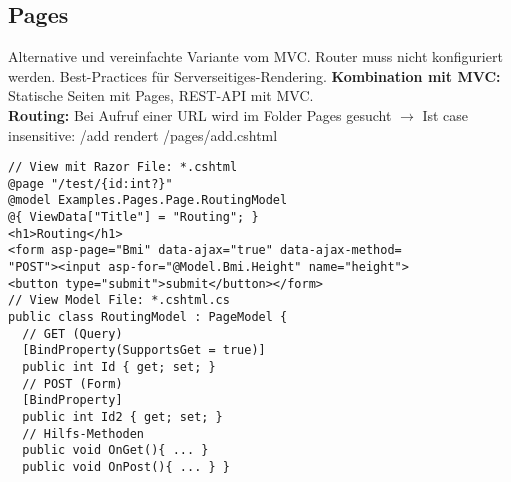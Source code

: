 \subsection{Pages}
Alternative und vereinfachte Variante vom MVC. Router muss nicht konfiguriert werden. Best-Practices für Serverseitiges-Rendering. \textbf{Kombination mit MVC:} Statische Seiten mit Pages, REST-API mit MVC.\\
\textcolor{b}{\textbf{Routing:}} Bei Aufruf einer URL wird im Folder Pages gesucht $\rightarrow$ Ist case insensitive: \textcolor{b}{/add} rendert \textcolor{b}{/pages/add.cshtml}
\begin{lstlisting}[style=csh]
// View mit Razor File: *.cshtml
@page "/test/{id:int?}"
@model Examples.Pages.Page.RoutingModel
@{ ViewData["Title"] = "Routing"; }
<h1>Routing</h1>
<form asp-page="Bmi" data-ajax="true" data-ajax-method=
"POST"><input asp-for="@Model.Bmi.Height" name="height">
<button type="submit">submit</button></form>
// View Model File: *.cshtml.cs
public class RoutingModel : PageModel {
  // GET (Query)
  [BindProperty(SupportsGet = true)]
  public int Id { get; set; }
  // POST (Form)
  [BindProperty]
  public int Id2 { get; set; }
  // Hilfs-Methoden
  public void OnGet(){ ... }
  public void OnPost(){ ... } }
\end{lstlisting}
